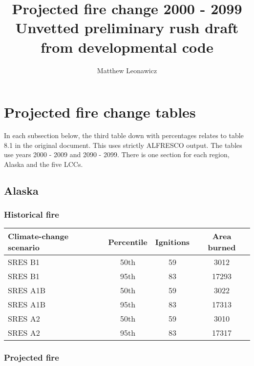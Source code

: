 \documentclass{article}\usepackage[]{graphicx}\usepackage[]{color}
\newcommand{\headcol}{\rowcolor{tableheadcolor}}
\begin{document}
\title{Projected fire change 2000 - 2099 \\ \large Unvetted preliminary rush draft from developmental code}
\author{Matthew Leonawicz}
\maketitle

\setlength{\aboverulesep}{0.2pt}
\setlength{\belowrulesep}{0.2pt}



\section{Projected fire change tables}
In each subsection below, the third table down with percentages relates to table 8.1 in the original document.
This uses strictly ALFRESCO output.
The tables use years 2000 - 2009 and 2090 - 2099.
There is one section for each region, Alaska and the five LCCs.



\subsection{Alaska}
\subsubsection{Historical fire}

\begin{table}[ht]
\centering
\begin{tabular}{lccc}
  \headcol 
 \toprule
Climate-change scenario & Percentile & Ignitions & Area burned \\ 
  \midrule
SRES B1 & 50th & 59 & 3012 \\ 
  SRES B1 & 95th & 83 & 17293 \\ 
  SRES A1B & 50th & 59 & 3022 \\ 
  SRES A1B & 95th & 83 & 17313 \\ 
  SRES A2 & 50th & 59 & 3010 \\ 
  SRES A2 & 95th & 83 & 17317 \\ 
   \bottomrule
\end{tabular}
\end{table}


\subsubsection{Projected fire}
\end{document}

